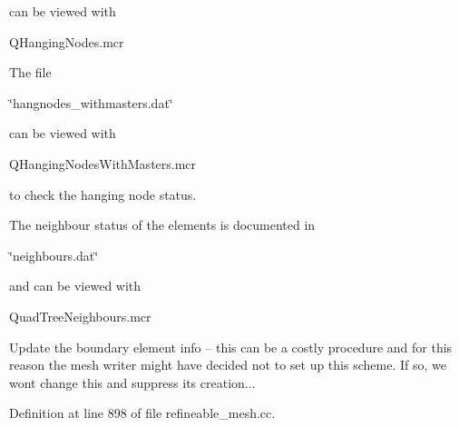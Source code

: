 can be viewed with
\begin{DoxyItemize}
\item Q\+Hanging\+Nodes.\+mcr
\end{DoxyItemize}
\begin{DoxyItemize}
\item The file
\begin{DoxyItemize}
\item \char`\"{}hangnodes\+\_\+withmasters.\+dat\char`\"{}
\end{DoxyItemize}can be viewed with
\begin{DoxyItemize}
\item Q\+Hanging\+Nodes\+With\+Masters.\+mcr
\end{DoxyItemize}to check the hanging node status.
\item The neighbour status of the elements is documented in
\begin{DoxyItemize}
\item \char`\"{}neighbours.\+dat\char`\"{}
\end{DoxyItemize}and can be viewed with
\begin{DoxyItemize}
\item Quad\+Tree\+Neighbours.\+mcr
\end{DoxyItemize}
\end{DoxyItemize}Update the boundary element info -- this can be a costly procedure and for this reason the mesh writer might have decided not to set up this scheme. If so, we won\textquotesingle{}t change this and suppress its creation... 

Definition at line 898 of file refineable\+\_\+mesh.\+cc.



